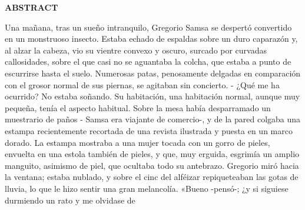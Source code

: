 \begin{center}
{\LARGE \bfseries ABSTRACT}

\vspace{2.5cm}
\end{center}


Una mañana, tras un sueño intranquilo, Gregorio Samsa se despertó convertido en un monstruoso insecto. Estaba echado de espaldas sobre un duro caparazón y, al alzar la cabeza, vio su vientre convexo y oscuro, surcado por curvadas callosidades, sobre el que casi no se aguantaba la colcha, que estaba a punto de escurrirse hasta el suelo. Numerosas patas, penosamente delgadas en comparación con el grosor normal de sus piernas, se agitaban sin concierto. - ¿Qué me ha ocurrido? No estaba soñando. Su habitación, una habitación normal, aunque muy pequeña, tenía el aspecto habitual. Sobre la mesa había desparramado un muestrario de paños - Samsa era viajante de comercio-, y de la pared colgaba una estampa recientemente recortada de una revista ilustrada y puesta en un marco dorado. La estampa mostraba a una mujer tocada con un gorro de pieles, envuelta en una estola también de pieles, y que, muy erguida, esgrimía un amplio manguito, asimismo de piel, que ocultaba todo su antebrazo. Gregorio miró hacia la ventana; estaba nublado, y sobre el cinc del alféizar repiqueteaban las gotas de lluvia, lo que le hizo sentir una gran melancolía. «Bueno -pensó-; ¿y si siguiese durmiendo un rato y me olvidase de

